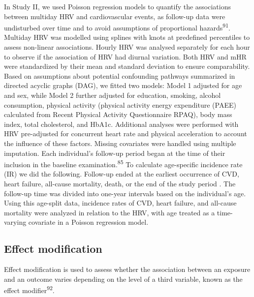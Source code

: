 \documentclass[
  letterpaper,
  headsepline=true,
  open=any]{scrbook}
\begin{document}
In Study II, we used Poisson regression models to quantify the
associations between multiday HRV and cardiovascular events, as
follow-up data were undisturbed over time and to avoid assumptions of
proportional hazards\textsuperscript{91}. Multiday HRV was modelled
using splines with knots at predefined percentiles to assess non-linear
associations. Hourly HRV was analysed separately for each hour to
observe if the association of HRV had diurnal variation. Both HRV and
mHR were standardized by their mean and standard deviation to ensure
comparability. Based on assumptions about potential confounding pathways
summarized in directed acyclic graphs (DAG), we fitted two models: Model
1 adjusted for age and sex, while Model 2 further adjusted for
education, smoking, alcohol consumption, physical activity (physical
activity energy expenditure (PAEE) calculated from Recent Physical
Activity Questionnaire RPAQ), body mass index, total cholesterol, and
HbA1c. Additional analyses were performed with HRV pre-adjusted for
concurrent heart rate and physical acceleration to account the influence
of these factors. Missing covariates were handled using multiple
imputation. Each individual's follow-up period began at the time of
their inclusion in the baseline examination.\textsuperscript{85} To
calculate age-specific incidence rate (IR) we did the following.
Follow-up ended at the earliest occurrence of CVD, heart failure,
all-cause mortality, death, or the end of the study period . The
follow-up time was divided into one-year intervals based on the
individual's age. Using this age-split data, incidence rates of CVD,
heart failure, and all-cause mortality were analyzed in relation to the
HRV, with age treated as a time-varying covariate in a Poisson
regression model.

\hypertarget{effect-modification}{%
\subsection{Effect modification}\label{effect-modification}}

Effect modification is used to assess whether the association between an
exposure and an outcome varies depending on the level of a third
variable, known as the effect modifier\textsuperscript{92}.
\end{document}
